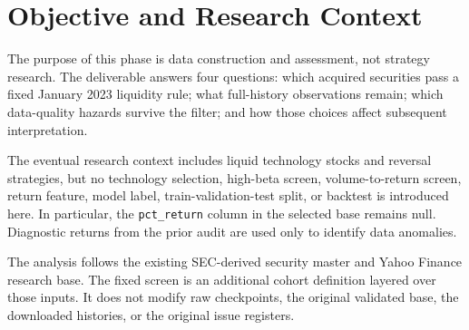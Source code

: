 \section{Objective and Research Context}

The purpose of this phase is data construction and assessment, not strategy
research. The deliverable answers four questions: which acquired securities
pass a fixed January 2023 liquidity rule; what full-history observations remain;
which data-quality hazards survive the filter; and how those choices affect
subsequent interpretation.

The eventual research context includes liquid technology stocks and reversal
strategies, but no technology selection, high-beta screen, volume-to-return
screen, return feature, model label, train-validation-test split, or backtest
is introduced here. In particular, the \texttt{pct\_return} column in the
selected base remains null. Diagnostic returns from the prior audit are used
only to identify data anomalies.

The analysis follows the existing SEC-derived security master and Yahoo Finance
research base. The fixed screen is an additional cohort definition layered over
those inputs. It does not modify raw checkpoints, the original validated base,
the downloaded histories, or the original issue registers.
